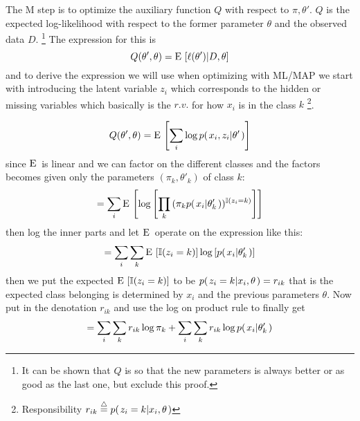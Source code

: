 \documentclass[a4paper,twoside=false,abstract=false,numbers=noenddot,
titlepage=false,headings=small,parskip=half,version=last]{scrartcl}
\begin{document}
\begin{solution}
    The M step is to optimize the auxiliary function $Q$ with respect to
    $\pi,\theta'$. $Q$ is the expected log-likelihood with respect to the former
    parameter $\theta$ and the observed data $D$. 
    \footnote{It can be shown that $Q$ is so that the new parameters is always
    better or as good as the last one, but exclude this proof.}
    The expression for this is
    \begin{equation}
        Q(\theta', \theta) = {\rm E}\,\left[\ell(\theta')|D,\theta\right]
    \end{equation}
    and to derive the expression we will use when optimizing with ML/MAP we start
    with introducing the latent variable $z_i$ which corresponds to the
    hidden or missing
    variables which basically is the $r.v.$ for how $x_i$
    is in the class $k$ \footnote{Responsibility $r_{ik}\eqdef
    \cprob{z_i=k}{x_i,\theta}$}.
    
    \begin{equation}
       Q(\theta', \theta) = 
       {\rm E}\,\left[\sum\limits_i\log p{(\left. x_i,z_i \middle\vert \theta' \right.)}\right] 
    \end{equation}
    since ${\rm E}\,$ is linear and we can factor on the different classes and
    the factors becomes given only the parameters $(\pi_k,\theta'_k)$ of class $k$:
    \begin{equation}
       =\sum\limits_i{\rm E}\, \left[ 
            \log\left[
                \prod\limits_k{(
                    \pi_kp{(\left. x_i \middle\vert \theta'_k \right.)}
                )^{\mathbb{I}(z_i=k)}} 
            \right]
        \right] 
    \end{equation}
    then log the inner parts and let ${\rm E}\,$ operate on the expression like
    this:
    \begin{equation}
        =\sum\limits_i\sum\limits_k{\rm E}\,
            \left[
                \mathbb{I}(z_i=k)
            \right]
            \log\left[
                p{(\left. x_i \middle\vert \theta'_k \right.)}
            \right]
    \end{equation}
    then we put the expected ${\rm E}\,\left[\mathbb{I}(z_i=k)\right]$ to be
    $p{(\left. z_i=k \middle\vert x_i,\theta \right.)}=r_{ik}$ that is the expected class belonging is
    determined by $x_i$ and the previous parameters $\theta$.
    Now put in the denotation $r_{ik}$ and use the log on product rule to
    finally get
    \begin{equation}
        = \sum\limits_i \sum\limits_k {r_{ik}\log \pi_k} +
        \sum\limits_i \sum\limits_k r_{ik} \log p{(\left. x_i \middle\vert \theta'_k \right.)}
    \end{equation}
    

\end{solution}
\end{document}
